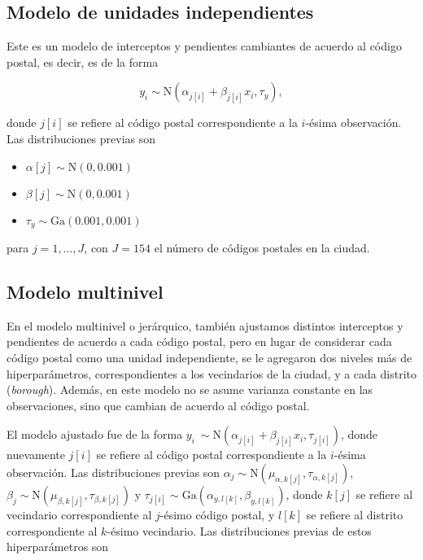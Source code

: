 \subsection{Modelo de unidades independientes}

Este es un modelo de interceptos y pendientes cambiantes de acuerdo al código postal, es decir, es de la forma 

\[
	y_i \sim \mathrm{N}(\alpha_{j[i]} + \beta_{j[i]}x_i, \tau_y),
\]

donde $j[i]$ se refiere al código postal correspondiente a la $i$-ésima observación. Las distribuciones previas son 

\begin{itemize}
	\item $\alpha[j] \sim \mathrm{N}(0, 0.001)$
	\item $\beta[j] \sim \mathrm{N}(0, 0.001)$
	\item $\tau_y \sim \mathrm{Ga}(0.001, 0.001)$
\end{itemize}

para $j = 1, \hdots, J$, con $J = 154$ el número de códigos postales en la ciudad.

\subsection{Modelo multinivel}

En el modelo multinivel o jerárquico, también ajustamos distintos interceptos y pendientes de acuerdo a cada código postal, pero en lugar de considerar cada código postal como una unidad independiente, se le agregaron dos niveles más de hiperparámetros, correspondientes a los vecindarios de la ciudad, y a cada distrito (\textit{borough}). Además, en este modelo no se asume varianza constante en las observaciones, sino que cambian de acuerdo al código postal.

El modelo ajustado fue de la forma $y_i ~ \sim \mathrm{N}(\alpha_{j[i]} + \beta_{j[i]}x_i, \tau_{j[i]})$, donde nuevamente $j[i]$ se refiere al código postal correspondiente a la $i$-ésima observación. Las distribuciones previas son $\alpha_j \sim \mathrm{N} (\mu_{\alpha, k[j]}, \tau_{\alpha, k[j]})$, $\beta_j \sim \mathrm{N} (\mu_{\beta, k[j]}, \tau_{\beta, k[j]})$ y $\tau_{j[i]} \sim \mathrm{Ga}(\alpha_{y, l[k]}, \beta_{y, l[k]})$, donde $k[j]$ se refiere al vecindario correspondiente al $j$-ésimo código postal, y $l[k]$ se refiere al distrito correspondiente al $k$-ésimo vecindario. Las distribuciones previas de estos hiperparámetros son 

